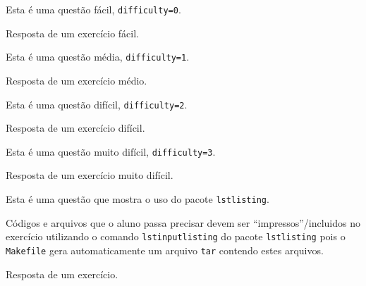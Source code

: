 \begin{Exercise}[label={easy}, difficulty=0]
  Esta é uma questão fácil, \verb+difficulty=0+.
\end{Exercise}
\begin{Answer}[ref={easy}]
  Resposta de um exercício fácil.
\end{Answer}
\begin{Exercise}[label={medium}, difficulty=1]
  Esta é uma questão média, \verb+difficulty=1+.
\end{Exercise}
\begin{Answer}[ref={medium}]
  Resposta de um exercício médio.
\end{Answer}
\begin{Exercise}[label={hard}, difficulty=2]
  Esta é uma questão difícil, \verb+difficulty=2+.
\end{Exercise}
\begin{Answer}[ref={hard}]
  Resposta de um exercício difícil.
\end{Answer}
\begin{Exercise}[label={veryhard}, difficulty=3]
  Esta é uma questão muito difícil, \verb+difficulty=3+.
\end{Exercise}
\begin{Answer}[ref={veryhard}]
  Resposta de um exercício muito difícil.
\end{Answer}
\begin{Exercise}[label={lstlisting}, difficulty=0]
  Esta é uma questão que mostra o uso do pacote \verb+lstlisting+.
  
  Códigos e arquivos que o aluno passa precisar devem ser
  ``impressos''/incluidos no exercício utilizando o comando
  \verb+lstinputlisting+ do pacote \verb+lstlisting+ pois o \verb+Makefile+ gera
  automaticamente um arquivo \verb+tar+ contendo estes arquivos.
\end{Exercise}
\begin{Answer}[ref={lstlisting}]
  Resposta de um exercício.
\end{Answer}

